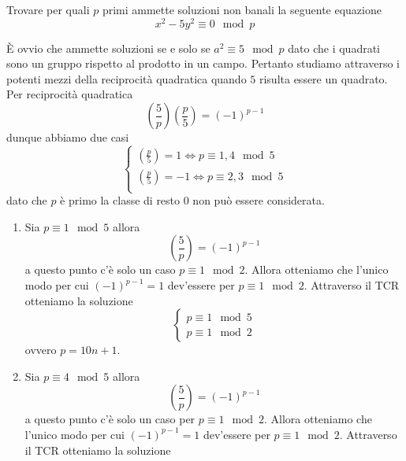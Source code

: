\begin{esercizio}
	Trovare per quali $p$ primi ammette soluzioni non banali la seguente equazione
	\begin{equation*}
		x^2 - 5y^2 \equiv 0 \mod p
	\end{equation*}
	
	È ovvio che ammette soluzioni se e solo se $a^2 \equiv 5 \mod p$ dato che i 
	quadrati sono un gruppo rispetto al prodotto in un campo. Pertanto studiamo
	attraverso i potenti mezzi della reciprocità quadratica quando $5$ risulta essere 
	un quadrato. Per reciprocità quadratica
	\begin{equation*}
		 \left(\frac{5}{p}\right) \left(\frac{p}{5}\right) = (-1)^{p-1}
	\end{equation*}
	dunque abbiamo due casi 
	\begin{equation*}
		\begin{cases}
			\left(\frac{p}{5}\right) = 1 \iff p \equiv  1, 4 \mod 5 \\
			\left(\frac{p}{5}\right) = -1 \iff p \equiv 2, 3 \mod 5 \\	
		\end{cases}
	\end{equation*}
	dato che $p$ è primo la classe di resto $0$ non può essere considerata.
	\begin{enumerate}
		\item Sia $p \equiv 1 \mod 5$ allora 
			\begin{equation*}
				\left(\frac{5}{p}\right) = (-1)^{p-1}
			\end{equation*}
			a questo punto c'è solo un caso $p \equiv 1 \mod 2$. Allora otteniamo 
			che l'unico modo per cui  $(-1)^{p-1}= 1$ dev'essere per
			$p \equiv 1 \mod 2$. Attraverso il TCR otteniamo la soluzione
			\begin{equation*}
				\begin{cases}
					p \equiv 1 \mod 5 \\
					p \equiv 1 \mod 2
				\end{cases}
			\end{equation*}
			ovvero $p = 10n + 1$.
		\item Sia $p \equiv 4 \mod 5$ allora 
			\begin{equation*}
				\left(\frac{5}{p}\right) = (-1)^{p-1}
			\end{equation*}
			a questo punto c'è solo un caso per $p \equiv 1 \mod 2$. Allora otteniamo 
			che l'unico modo per cui  $(-1)^{p-1}= 1$ dev'essere per
			$p \equiv 1 \mod 2$. Attraverso il TCR otteniamo la soluzione

\end{enumerate}
\end{esercizio}
